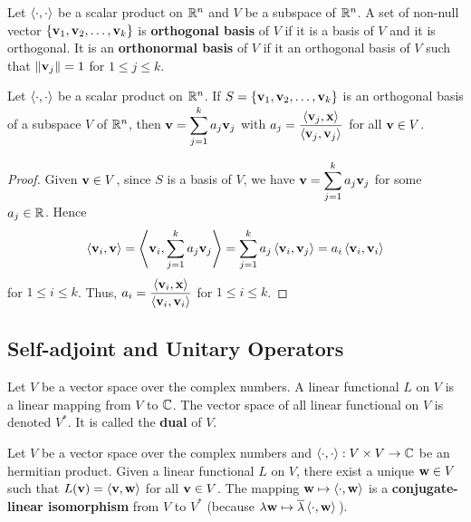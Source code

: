 \begin{defn}
Let $\left\langle{\cdot} , {\cdot}\right\rangle$ be a scalar product on $\mathbb{R}^n$ and $V$ be a
subspace of $\mathbb{R}^n$.  A set of non-null vector
$\{\mathbf{v}_1, \mathbf{v}_2, \ldots , \mathbf{v}_k\}$ is
{\bfseries orthogonal basis} of $V$ if
it is a basis of $V$ and it is orthogonal.  It is an {\bfseries
  orthonormal basis} of $V$ if it 
an orthogonal basis of $V$ such that $\|\mathbf{v}_j\| = 1$ for
$1 \leq j \leq k$.
\end{defn}

\begin{prop}
Let $\left\langle{\cdot} , {\cdot}\right\rangle$ be a scalar product on $\mathbb{R}^n$.  If
$S = \{\mathbf{v}_1, \mathbf{v}_2, \ldots , \mathbf{v}_k\}$ is an orthogonal
basis of a subspace $V$ of $\mathbb{R}^n$, then
$\displaystyle \mathbf{v} = \sum_{j=1}^k a_j \mathbf{v}_j$ with
$\displaystyle a_j = \frac{\left\langle{\mathbf{v}_j} , {\mathbf{x}}\right\rangle}
{\left\langle{\mathbf{v}_j} , {\mathbf{v}_j}\right\rangle}$ for all $\mathbf{v} \in V$.
\label{C14L2}
\end{prop}

\begin{proof}
Given $\mathbf{v} \in V$, since $S$ is a basis of $V$, we have
$\displaystyle \mathbf{v} = \sum_{j=1}^k a_j \mathbf{v}_j$ for some
$a_j \in \mathbb{R}$.  Hence
\[
\left\langle{\mathbf{v}_i} , {\mathbf{v}}\right\rangle =
\left\langle{\mathbf{v}_i} , {\sum_{j=1}^k a_j \mathbf{v}_j}\right\rangle
= \sum_{j=1}^k a_j \left\langle{\mathbf{v}_i} , {\mathbf{v}_j}\right\rangle
= a_i \left\langle{\mathbf{v}_i} , {\mathbf{v}_i}\right\rangle
\]
for $1 \leq i \leq k$.  Thus,
$\displaystyle a_i = \frac{\left\langle{\mathbf{v}_i} , {\mathbf{x}}\right\rangle}
{\left\langle{\mathbf{v}_i} , {\mathbf{v}_i}\right\rangle}$ for $1 \leq i \leq k$.
\end{proof}

\subsection{Self-adjoint and Unitary Operators}

Let $V$ be a vector space over the complex numbers.  A linear
functional $L$ on $V$ is a linear mapping
from $V$ to $\mathbb{C}$.  The vector space of all linear functional on $V$
is denoted $V^\ast$. It is called the {\bfseries dual} of
$V$.

\begin{theorem}[Reisz]
Let $V$ be a vector space over the complex numbers and
$\left\langle{\cdot} , {\cdot}\right\rangle:V \times V \rightarrow \mathbb{C}$ be an hermitian product.
Given a linear functional $L$ on $V$, there exist a unique $\mathbf{w}\in V$
such that $L(\mathbf{v}) = \left\langle{\mathbf{v}} , {\mathbf{w}}\right\rangle$ for all $\mathbf{v} \in V$.  The
mapping $\mathbf{w} \mapsto \left\langle{\cdot} , {\mathbf{w}}\right\rangle$ is a
{\bfseries conjugate-linear isomorphism}
from $V$ to $V^\ast$ (because
$\lambda \mathbf{w} \mapsto \overline{\lambda} \left\langle{\cdot} , {\mathbf{w}}\right\rangle$\,).
\end{theorem}

